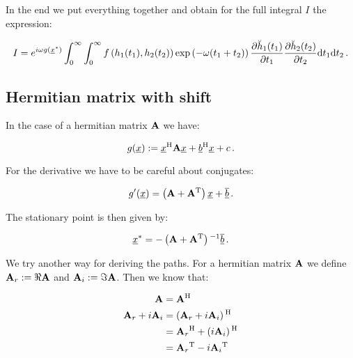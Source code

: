 \documentclass[a4paper,10pt]{article}
\begin{document}
In the end we put everything together and obtain for the full integral $I$
the expression:


\begin{equation}
 I = e^{i \omega g\left(\underline{x}^{*}\right)}
     \int_0^\infty \int_0^\infty
       f\left(h_1(t_1), h_2(t_2)\right)
       \exp\left(-\omega (t_1 + t_2)\right)
       \frac{\partial \breve{h}_1(t_1)}{\partial t_1}
       \frac{\partial \breve{h}_2(t_2)}{\partial t_2}
     \mathrm{d}t_1 \mathrm{d}t_2 \,.
\end{equation}


\subsection{Hermitian matrix with shift}
\label{sec:mv_herm_full}

In the case of a hermitian matrix $\mathbf{A}$ we have:

\begin{equation}
 g(\underline{x}) := \underline{x}{}^{\textnormal{H}} \mathbf{A} \underline{x} + \underline{b}{}^{\textnormal{H}} \underline{x} + c \,.
\end{equation}

For the derivative we have to be careful about conjugates:

\begin{equation}
 g^{\prime}(\underline{x}) = \left(\mathbf{A} + \mathbf{A}{}^{\textnormal{T}}\right) \underline{x} + \overline{\underline{b}} \,.
\end{equation}

The stationary point is then given by:

\begin{equation}
 \underline{x}^{*} = -\left(\mathbf{A} + \mathbf{A}{}^{\textnormal{T}}\right){}^{-1} \overline{\underline{b}} \,.
\end{equation}





We try another way for deriving the paths. 
For a hermitian matrix $\mathbf{A}$ we define $\mathbf{A}_r := \Re \mathbf{A}$
and $\mathbf{A}_i := \Im \mathbf{A}$. Then we know that:

\begin{equation}
\begin{split}
 \mathbf{A} & = \mathbf{A}{}^{\textnormal{H}} \\
 \mathbf{A}_r + i \mathbf{A}_i & = \left(\mathbf{A}_r + i \mathbf{A}_i\right){}^{\textnormal{H}} \\
                         & = \mathbf{A}_r{}^{\textnormal{H}} + \left(i \mathbf{A}_i\right){}^{\textnormal{H}} \\
                         & = \mathbf{A}_r{}^{\textnormal{T}} - i \mathbf{A}_i{}^{\textnormal{T}} \\
\end{split}
\end{equation}
\end{document}
